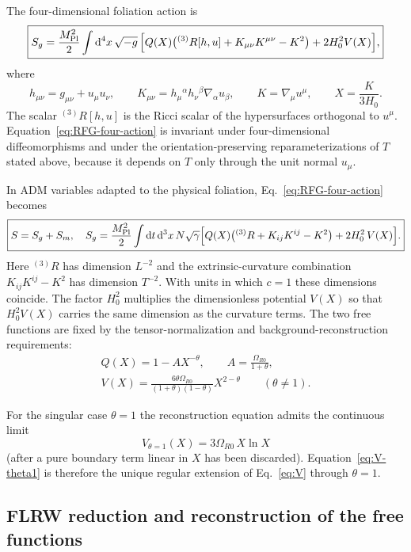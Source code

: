 \documentclass[11pt,a4paper]{article}
\renewcommand{\dd}{\mathrm{d}}
\newcommand{\mpl}{M_{\rm Pl}}
\newcommand{\threeR}{{}^{(3)}R}
\newcommand{\Boxed}[1]{\boxed{\displaystyle #1}}
\begin{document}
The four-dimensional foliation action is
\begin{equation}
\Boxed{
S_g=\frac{\mpl^2}{2}
\int \dd^4x\,\sqrt{-g}\,
\Bigl[
Q(X)\bigl({}^{(3)}R[h,u]+K_{\mu\nu}K^{\mu\nu}-K^2\bigr)
+2H_0^2V(X)
\Bigr],
}
\label{eq:RFG-four-action}
\end{equation}
where
\[
h_{\mu\nu}=g_{\mu\nu}+u_\mu u_\nu,\qquad
K_{\mu\nu}=h_\mu{}^\alpha h_\nu{}^\beta\nabla_\alpha u_\beta,\qquad
K=\nabla_\mu u^\mu,\qquad
X=\frac{K}{3H_0}.
\]
The scalar \({}^{(3)}R[h,u]\) is the Ricci scalar of the hypersurfaces orthogonal to \(u^\mu\). Equation~\eqref{eq:RFG-four-action} is invariant under four-dimensional diffeomorphisms and under the orientation-preserving reparameterizations of \(T\) stated above, because it depends on \(T\) only through the unit normal \(u_\mu\).

In ADM variables adapted to the physical foliation, Eq.~\eqref{eq:RFG-four-action} becomes
\begin{equation}
\Boxed{
S=S_g+S_m,
\quad
S_g=\frac{\mpl^2}{2}\int\dd t\,\dd^3x\,N\sqrt{\gamma}
\Bigl[Q(X)\bigl({}^{(3)}R+K_{ij}K^{ij}-K^2\bigr)+2H_0^2\,V(X)\Bigr].
}
\label{eq:RFG-action}
\end{equation}
Here \(\threeR\) has dimension \(L^{-2}\) and the extrinsic-curvature combination \(K_{ij}K^{ij}-K^2\) has dimension \(T^{-2}\). With units in which \(c=1\) these dimensions coincide. The factor \(H_0^2\) multiplies the dimensionless potential \(V(X)\) so that \(H_0^2 V(X)\) carries the same dimension as the curvature terms. The two free functions are fixed by the tensor-normalization and background-reconstruction requirements:
\begin{align}
\Boxed{Q(X)=1-A X^{-\theta},\qquad A=\frac{\Omega_{R0}}{1+\theta},}
\label{eq:Q}\\[0.5em]
\Boxed{V(X)=\frac{6\theta\Omega_{R0}}{(1+\theta)(1-\theta)}X^{2-\theta}\qquad(\theta\neq1).}
\label{eq:V}
\end{align}

For the singular case \(\theta=1\) the reconstruction equation admits the continuous limit
\begin{equation}
\Boxed{V_{\theta=1}(X)=3\Omega_{R0}\,X\ln X}
\label{eq:V-theta1}
\end{equation}
(after a pure boundary term linear in \(X\) has been discarded). Equation~\eqref{eq:V-theta1} is therefore the unique regular extension of Eq.~\eqref{eq:V} through \(\theta=1\).


\subsection{FLRW reduction and reconstruction of the free functions}
\end{document}
